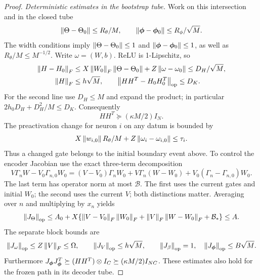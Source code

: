 \begin{proof}
\emph{Deterministic estimates in the bootstrap tube.}
Work on this intersection and in the closed tube
\[
 \left\lVert\Theta-\Theta_0\right\rVert\le R_\theta/M,\qquad
 \left\lVert{\boldsymbol{\phi}}-{\boldsymbol{\phi}}_0\right\rVert\le R_\phi/\sqrt M.
\]
The width conditions imply $\left\lVert\Theta-\Theta_0\right\rVert\le1$ and
$\left\lVert{\boldsymbol{\phi}}-{\boldsymbol{\phi}}_0\right\rVert\le1$, as well as
$R_\theta/M\le M^{-1/2}$. Write $\omega=(W,b)$.
ReLU is 1-Lipschitz, so
\begin{align*}
 \left\lVert H-H_0\right\rVert_F
 &\le X\left\lVert W_0\right\rVert_F\left\lVert\Theta-\Theta_0\right\rVert
        +Z\left\lVert\omega-\omega_0\right\rVert
 \le D_H/\sqrt M,\\
 \left\lVert H\right\rVert_F&\le h\sqrt M,\qquad
 \left\lVert HH^T-H_0H_0^T\right\rVert_{\rm op}\le D_K.
\end{align*}
For the second line use $D_H\le M$ and expand the product; in
particular $2h_0D_H+D_H^2/M\le D_K$.
Consequently
\begin{equation}\label{eq:astra_headfloor}
 HH^T\succeq(\kappa M/2)I_N.
\end{equation}
The preactivation change for neuron $i$ on any datum is bounded by
\[X\left\lVert w_{i,0}\right\rVert R_\theta/M+Z\left\lVert\omega_i-\omega_{i,0}\right\rVert\le\tau_i.\]
Thus a changed gate belongs to the initial boundary event above.
To control the encoder Jacobian use the exact three-term decomposition
\begin{equation}\label{eq:astra_three_terms}
 V\Gamma_nW-V_0\Gamma_{n,0}W_0
 =(V-V_0)\Gamma_nW_0+V\Gamma_n(W-W_0)
       +V_0(\Gamma_n-\Gamma_{n,0})W_0.
\end{equation}
The last term has operator norm at most $\mathcal B$. The first
uses the current gates and initial $W_0$; the second uses the current
$V$; both distinctions matter. Averaging over $n$ and multiplying by
$x_n$ yields
\[
 \left\lVert J_\Theta\right\rVert_{\rm op}
 \le A_0+X\{\left\lVert V-V_0\right\rVert_F\left\lVert W_0\right\rVert_F
       +\left\lVert V\right\rVert_F\left\lVert W-W_0\right\rVert_F+\mathcal B_*\}\le A.
\]
The separate block bounds are
\[
 \left\lVert J_\omega\right\rVert_{\rm op}\le Z\left\lVert V\right\rVert_F\le\Omega,\qquad
 \left\lVert J_V\right\rVert_{\rm op}\le h\sqrt M,\qquad
 \left\lVert J_\beta\right\rVert_{\rm op}=1,
 \quad \left\lVert J_{\boldsymbol{\phi}}\right\rVert_{\rm op}\le B\sqrt M.
\]
Furthermore $J_{\boldsymbol{\phi}} J_{\boldsymbol{\phi}}^T\succeq
(HH^T)\otimes I_C\succeq(\kappa M/2)I_{NC}$.
These estimates also hold for the frozen path in its decoder tube.


\end{proof}
